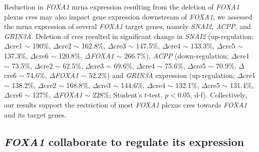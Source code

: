 Reduction in \emph{FOXA1} \gls{mrna} expression resulting from the deletion of \emph{FOXA1} plexus \glspl{cre} may also impact gene expression downstream of \emph{FOXA1}, we assessed the \gls{mrna} expression of several \emph{FOXA1} target genes, namely \emph{SNAI2}, \emph{ACPP}, and \emph{GRIN3A}.
Deletion of \glspl{cre} resulted in significant change in \emph{SNAI2} (up-regulation; $\Delta$\gls{cre}1 $\sim$ 190\%, $\Delta$\gls{cre}2 $\sim$ 162.8\%, $\Delta$\gls{cre}3 $\sim$ 147.5\%, $\Delta$\gls{cre}4 $\sim$ 133.3\%, $\Delta$\gls{cre}5 $\sim$ 137.3\%, $\Delta$\gls{cre}6 $\sim$ 120.8\%, $\Delta$\emph{FOXA1} $\sim$ 266.7\%), \emph{ACPP} (down-regulation; $\Delta$\gls{cre}1 $\sim$ 73.5\%, $\Delta$\gls{cre}2 $\sim$ 62.5\%, $\Delta$\gls{cre}3 $\sim$ 69.6\%, $\Delta$\gls{cre}4 $\sim$ 75.6\%, $\Delta$\gls{cre}5 $\sim$ 70.9\%, $\Delta$\gls{cre}6 $\sim$ 74.6\%, $\Delta$\emph{FOXA1} $\sim$ 52.2\%) and \emph{GRIN3A} expression (up-regulation; $\Delta$\gls{cre}1 $\sim$ 138.2\%, $\Delta$\gls{cre}2 $\sim$ 168.8\%, $\Delta$\gls{cre}3 $\sim$ 144.6\%, $\Delta$\gls{cre}4 $\sim$ 132.1\%, $\Delta$\gls{cre}5 $\sim$ 131.4\%, $\Delta$\gls{cre}6 $\sim$ 127\%, $\Delta$\emph{FOXA1} $\sim$ 228\%; Student's $t$-test, $p < 0.05$, d-f).
Collectively, our results support the restriction of most \emph{FOXA1} plexus \glspl{cre} towards \emph{FOXA1} and its target genes.

\subsection{\emph{FOXA1}  collaborate to regulate its expression}

